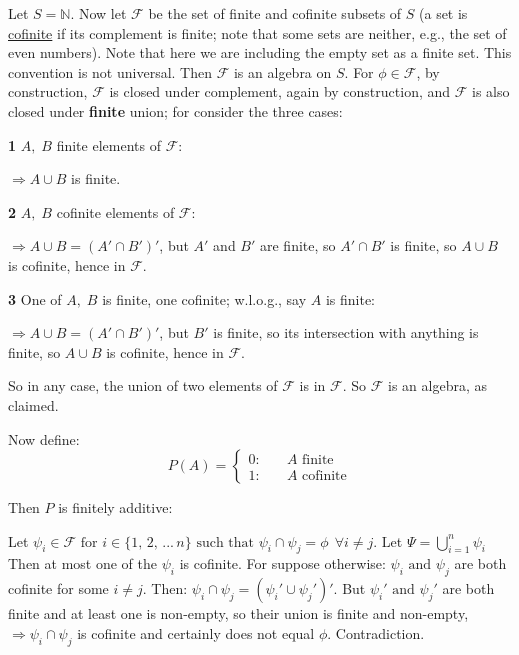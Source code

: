 \documentclass[12pt,a4paper]{article}
\begin{document}
Let $S = \mathbb{N}$. Now let $\mathcal{F}$ be the set of finite and cofinite subsets of $S$ (a set is \underline{cofinite} if its complement is finite; note that some sets are neither, e.g., the set of even numbers). Note that here we are including the empty set as a finite set. This convention is not universal. Then $\mathcal{F}$ is an algebra on $S$. For $\phi\in\mathcal{F}$, by construction, $\mathcal{F}$ is closed under complement, again by construction, and $\mathcal{F}$ is also closed under {\bf finite} union; for consider the three cases:\par
\vspace{10pt}
{\bf 1 }  $A,\;B$ finite elements of $\mathcal{F}$:\par
\vspace{10pt}
\indent $\Rightarrow A\cup B$ is finite.\par
\vspace{10pt}
{\bf 2 }  $A,\;B$ cofinite elements of $\mathcal{F}$:\par
\vspace{10pt}
\indent $\Rightarrow A\cup B = (A'\cap B')'$, but $A'$ and $B'$ are finite, so $A'\cap B'$ is finite, so $A\cup B$ is cofinite, hence in $\mathcal{F}.$\par
\vspace{10pt}
{\bf 3 }  One of $A,\;B$ is finite, one cofinite; w.l.o.g., say $A$ is finite:\par
\vspace{10pt}
\indent $\Rightarrow A\cup B = (A'\cap B')'$, but $B'$ is finite, so its intersection with anything is finite, so $A\cup B$ is cofinite, hence in $\mathcal{F}.$

So in any case, the union of two elements of $\mathcal{F}$ is in $\mathcal{F}$. So $\mathcal{F}$ is an algebra, as claimed.\par

Now define:
$$P(A) = \left\{\begin{array}{ll} 0:\quad & A \text{ finite}\\ 1:\quad & A \text{ cofinite}\end{array}\right.$$

Then $P$ is finitely additive:\par
Let $\psi_i\in\mathcal{F} \text{ for } i \in \{1,\,2,\,...\,n\} \text{ such that } \psi_i \cap \psi_j = \phi \:\:\forall i\neq j$.
Let $\Psi = \bigcup\limits_{i=1}^{n}\psi_i$\\
\indent Then at most one of the $\psi_i$ is cofinite. For suppose otherwise: $\psi_i \text{ and } \psi_j$ are both cofinite for some $i\neq j$. Then: $\psi_i \cap \psi_j = (\psi_i' \cup \psi_j')'$. But $\psi_i' \text{ and } \psi_j'$ are both finite and at least one is non-empty, so their union is finite and non-empty, $\Rightarrow \psi_i \cap \psi_j$ is cofinite and certainly does not equal $\phi$. Contradiction.\par
\end{document}
